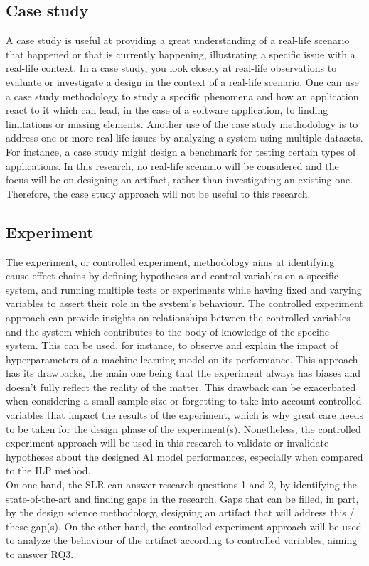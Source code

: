 \subsection{Case study}

A case study is useful at providing a great understanding of a real-life scenario that happened 
or that is currently happening, illustrating a specific issue with a real-life context.
In a case study, you look closely at real-life observations to evaluate or investigate
a design in the context of a real-life scenario\cite{sarah2011caseStudy}.
One can use a case study methodology to study a specific phenomena and how an application react to it
which can lead, in the case of a software application, to finding
limitations or missing elements.
Another use of the case study methodology is 
to address one or more real-life issues by analyzing 
a system using multiple datasets.
For instance, a case study might design a benchmark for testing 
certain types of applications.
In this research, no real-life scenario will be considered and the focus will be on designing an artifact,
rather than investigating an existing one. 
Therefore, the case study approach will not be useful to this research.

\subsection{Experiment}
 
 
The experiment, or controlled experiment, methodology aims at identifying cause-effect 
chains by defining hypotheses and control variables on a specific system,
and running multiple tests or experiments while having fixed and varying variables to assert 
their role in the system's behaviour\cite{basili2007controlledExperiment}.
The controlled experiment approach 
can provide insights on relationships between the controlled variables and the system
which contributes to the body of knowledge of the specific system.
This can be used, for instance, to observe and explain the impact of hyperparameters of a machine learning
model on its performance.
This approach has its drawbacks, the main one being 
that the experiment always has biases and doesn't fully reflect the reality
of the matter. This drawback can be exacerbated when considering 
a small sample size or forgetting
to take into account controlled variables that impact the results
of the experiment, which is why great care needs to be taken 
for the design phase of the experiment(s).
Nonetheless, the controlled experiment approach will be used in this research to validate or invalidate hypotheses
about the designed AI model performances, especially when compared to the ILP method.\\


On one hand, the SLR can answer research questions 1 and 2,
by identifying the state-of-the-art and finding gaps in the research.
Gaps that can be filled, in part, by the design science methodology,
designing an artifact that will address this / these gap(s).
On the other hand, the controlled experiment approach
will be used to analyze the behaviour of the artifact
according to controlled variables, 
aiming to answer RQ3.